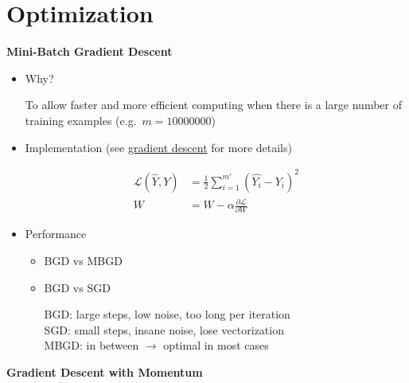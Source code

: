 \documentclass[
]{book}
\providecommand{\tightlist}{%
  \setlength{\itemsep}{0pt}\setlength{\parskip}{0pt}}
\begin{document}
\hypertarget{optimization}{%
\section{Optimization}\label{optimization}}

\textbf{Mini-Batch Gradient Descent}

\begin{itemize}
\item
  Why?

  To allow faster and more efficient computing when there is a large
  number of training examples (e.g.~\(m=10000000\))
\item
  Implementation (see \href{../../DL/ANN/\#gd}{gradient descent} for
  more details)

  \[\begin{align}
    \mathcal{L}(\hat{Y},Y)&=\frac{1}{2}\sum_{i=1}^{m'}{(\hat{Y_i}-Y_i)^2} \\
    W&=W-\alpha\frac{\partial\mathcal{L}}{\partial W}
    \end{align}\]
\item
  Performance

  \begin{itemize}
  \tightlist
  \item
    BGD vs MBGD
  \end{itemize}

  \begin{itemize}
  \item
    BGD vs SGD

    BGD: large steps, low noise, too long per iteration\\
    SGD: small steps, insane noise, lose vectorization\\
    MBGD: in between \(\rightarrow\) optimal in most cases
  \end{itemize}
\end{itemize}

\textbf{Gradient Descent with Momentum}
\end{document}
